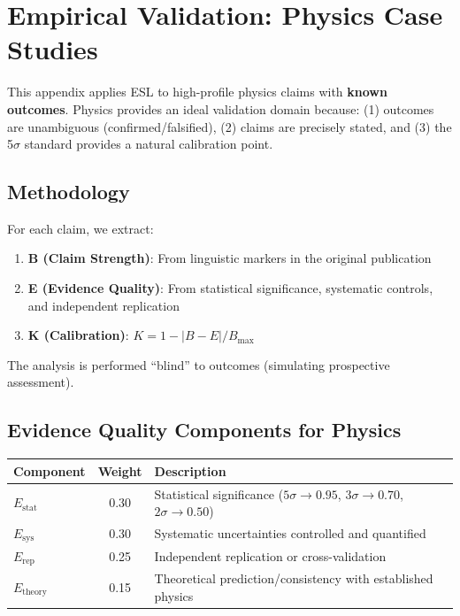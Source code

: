 \documentclass[11pt,a4paper]{article}
\begin{document}

\section{Empirical Validation: Physics Case Studies}
\label{app:physics-validation}

This appendix applies ESL to high-profile physics claims with \textbf{known outcomes}. Physics provides an ideal validation domain because: (1) outcomes are unambiguous (confirmed/falsified), (2) claims are precisely stated, and (3) the 5$\sigma$ standard provides a natural calibration point.

\subsection{Methodology}

For each claim, we extract:
\begin{enumerate}
    \item \textbf{B (Claim Strength)}: From linguistic markers in the original publication
    \item \textbf{E (Evidence Quality)}: From statistical significance, systematic controls, and independent replication
    \item \textbf{K (Calibration)}: $K = 1 - |B - E| / B_{\max}$
\end{enumerate}

The analysis is performed ``blind'' to outcomes (simulating prospective assessment).

\subsection{Evidence Quality Components for Physics}

\begin{center}
\begin{tabular}{lcp{7cm}}
\toprule
\textbf{Component} & \textbf{Weight} & \textbf{Description} \\
\midrule
$E_{\text{stat}}$ & 0.30 & Statistical significance ($5\sigma \to 0.95$, $3\sigma \to 0.70$, $2\sigma \to 0.50$) \\
$E_{\text{sys}}$ & 0.30 & Systematic uncertainties controlled and quantified \\
$E_{\text{rep}}$ & 0.25 & Independent replication or cross-validation \\
$E_{\text{theory}}$ & 0.15 & Theoretical prediction/consistency with established physics \\
\bottomrule
\end{tabular}
\end{center}
\end{document}

